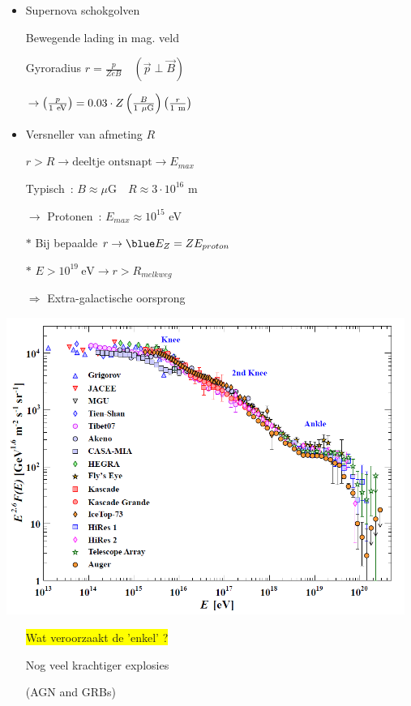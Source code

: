 \Tr
\begin{itemize}
\item Supernova schokgolven
\item[] Bewegende lading in mag. veld
\item[] Gyroradius $r=\frac{p}{ZeB} \quad (\vec{p} \perp \vec{B})$
\item[] $\rightarrow
         \left(\frac{p}{1~\rm{eV}}\right)=0.03 \cdot Z\left(\frac{B}{1~\mu\rm{G}}\right)
         \left(\frac{r}{1~\rm{m}}\right)$
\item Versneller van afmeting $R$
\item[] $r > R \rightarrow \text{deeltje~ontsnapt} \rightarrow E_{max}$
\item[] Typisch~: $B \approx \mu\text{G} \quad R \approx 3 \cdot 10^{16}$ m
\item[] $\rightarrow$ Protonen~: $E_{max} \approx 10^{15}$ eV
\item[$\ast$] Bij bepaalde $r \rightarrow {\blue E_{Z}=Z E_{proton}}$
\item[$\ast$] $E>10^{19}~\text{eV} \rightarrow r>R_{melkweg}$
\item[] $\Rightarrow$ Extra-galactische oorsprong
\end{itemize}

\newpage
%
\includegraphics[keepaspectratio,width=13cm]{cr-all-scaled26}
%
\begin{itemize}
\item[] \colorbox{yellow}{Wat veroorzaakt de 'enkel' ?}
\item[] Nog veel krachtiger explosies
\item[] (AGN and GRBs)
\end{itemize}

